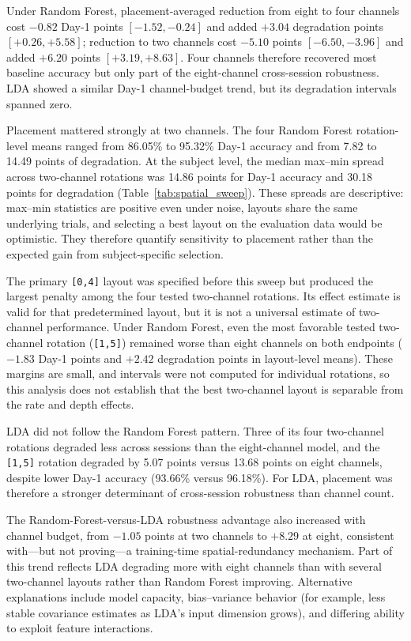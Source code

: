 \documentclass[preprint,12pt]{elsarticle}
\begin{document}
Under Random Forest, placement-averaged reduction from eight to four channels cost $-0.82$ Day-1 points $[-1.52,-0.24]$ and added $+3.04$ degradation points $[+0.26,+5.58]$; reduction to two channels cost $-5.10$ points $[-6.50,-3.96]$ and added $+6.20$ points $[+3.19,+8.63]$. Four channels therefore recovered most baseline accuracy but only part of the eight-channel cross-session robustness. LDA showed a similar Day-1 channel-budget trend, but its degradation intervals spanned zero.

Placement mattered strongly at two channels. The four Random Forest rotation-level means ranged from 86.05\% to 95.32\% Day-1 accuracy and from 7.82 to 14.49 points of degradation. At the subject level, the median max--min spread across two-channel rotations was 14.86 points for Day-1 accuracy and 30.18 points for degradation (Table~\ref{tab:spatial_sweep}). These spreads are descriptive: max--min statistics are positive even under noise, layouts share the same underlying trials, and selecting a best layout on the evaluation data would be optimistic. They therefore quantify sensitivity to placement rather than the expected gain from subject-specific selection.

The primary \texttt{[0,4]} layout was specified before this sweep but produced the largest penalty among the four tested two-channel rotations. Its effect estimate is valid for that predetermined layout, but it is not a universal estimate of two-channel performance. Under Random Forest, even the most favorable tested two-channel rotation (\texttt{[1,5]}) remained worse than eight channels on both endpoints ($-1.83$ Day-1 points and $+2.42$ degradation points in layout-level means). These margins are small, and intervals were not computed for individual rotations, so this analysis does not establish that the best two-channel layout is separable from the rate and depth effects.

LDA did not follow the Random Forest pattern. Three of its four two-channel rotations degraded less across sessions than the eight-channel model, and the \texttt{[1,5]} rotation degraded by 5.07 points versus 13.68 points on eight channels, despite lower Day-1 accuracy (93.66\% versus 96.18\%). For LDA, placement was therefore a stronger determinant of cross-session robustness than channel count.

The Random-Forest-versus-LDA robustness advantage also increased with channel budget, from $-1.05$ points at two channels to $+8.29$ at eight, consistent with---but not proving---a training-time spatial-redundancy mechanism. Part of this trend reflects LDA degrading more with eight channels than with several two-channel layouts rather than Random Forest improving. Alternative explanations include model capacity, bias--variance behavior (for example, less stable covariance estimates as LDA's input dimension grows), and differing ability to exploit feature interactions.
\end{document}
